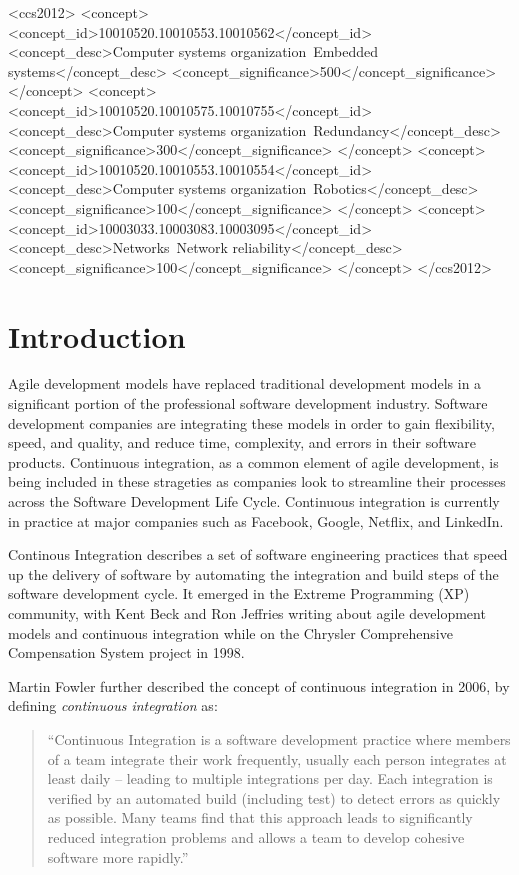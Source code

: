 \documentclass{sig-alternate}
\begin{document}
\begin{CCSXML}
<ccs2012>
 <concept>
  <concept_id>10010520.10010553.10010562</concept_id>
  <concept_desc>Computer systems organization~Embedded systems</concept_desc>
  <concept_significance>500</concept_significance>
 </concept>
 <concept>
  <concept_id>10010520.10010575.10010755</concept_id>
  <concept_desc>Computer systems organization~Redundancy</concept_desc>
  <concept_significance>300</concept_significance>
 </concept>
 <concept>
  <concept_id>10010520.10010553.10010554</concept_id>
  <concept_desc>Computer systems organization~Robotics</concept_desc>
  <concept_significance>100</concept_significance>
 </concept>
 <concept>
  <concept_id>10003033.10003083.10003095</concept_id>
  <concept_desc>Networks~Network reliability</concept_desc>
  <concept_significance>100</concept_significance>
 </concept>
</ccs2012>  
\end{CCSXML}



\section{Introduction}
Agile development models have replaced traditional development models in a significant portion of the professional software development industry. Software development companies are integrating these models in order to gain flexibility, speed, and quality, and reduce time, complexity, and errors in their software products. Continuous integration, as a common element of agile development, is being included in these strageties as companies look to streamline their processes across the Software Development Life Cycle.\cite{singh:lifecycle} Continuous integration is currently in practice at major companies such as Facebook, Google, Netflix, and LinkedIn.

Continous Integration describes a set of software engineering practices that speed up the delivery of software by automating the integration and build steps of the software development cycle. It emerged in the Extreme Programming (XP) community, with Kent Beck and Ron Jeffries writing about agile development models and continuous integration while on the Chrysler Comprehensive Compensation System project in 1998\cite{beck:extreme_programming}\cite{beck:agile_manifesto}.

Martin Fowler further described the concept of continuous integration in 2006, by defining \textit{continuous integration} as:
\begin{quote}
``Continuous Integration is a software development practice where members of a team integrate their work frequently, usually each person integrates at least daily -- leading to multiple integrations per day. Each integration is verified by an automated build (including test) to detect errors as quickly as possible. Many teams find that this approach leads to significantly reduced integration problems and allows a team to develop cohesive software more rapidly.''\cite{fowler:continuous}
\end{quote}
\end{document}
